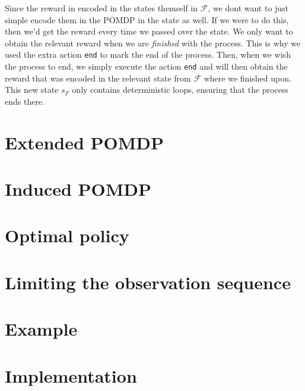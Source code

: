 



Since the reward in encoded in the states themself in $\mathcal{F}$, we dont want to just simple encode them in the POMDP in the state as well. If we were to do this, then we'd get the reward every time we passed over the state. We only want to obtain the relevant reward when we are \textit{finished} with the process. This is why we used the extra action \texttt{end} to mark the end of the process. Then, when we wish the process to end, we simply execute the action \texttt{end} and will then obtain the reward that was encoded in the relevant state from $\mathcal{F}$ where we finished upon. This new state $s_F$ only contains deterministic loops, ensuring that the process ends there. 

\section{Extended POMDP}


\section{Induced POMDP}


\section{Optimal policy}


\section{Limiting the observation sequence}


\section{Example}


\section{Implementation}


